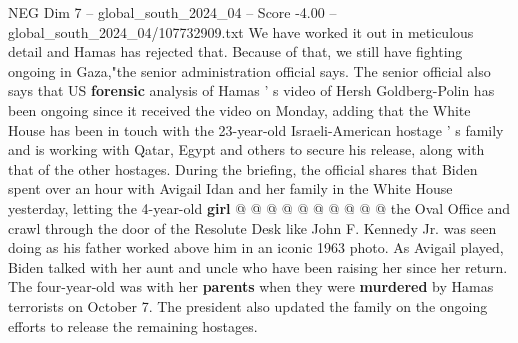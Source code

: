 \begin{textsample}{NEG Dim 7 – global\_south\_2024\_04 – Score -4.00 – global\_south\_2024\_04/107732909.txt}
We have worked it out in meticulous detail and Hamas has rejected that.
Because of that, we still have fighting ongoing in Gaza,"the senior administration official says.
The senior official also says that US \textbf{forensic} analysis of Hamas ' s video of Hersh Goldberg-Polin has been ongoing since it received the video on Monday, adding that the White House has been in touch with the 23-year-old Israeli-American hostage ' s family and is working with Qatar, Egypt and others to secure his release, along with that of the other hostages.
During the briefing, the official shares that Biden spent over an hour with Avigail Idan and her family in the White House yesterday, letting the 4-year-old \textbf{girl} @ @ @ @ @ @ @ @ @ @ the Oval Office and crawl through the door of the Resolute Desk like John F.
Kennedy Jr. was seen doing as his father worked above him in an iconic 1963 photo.
As Avigail played, Biden talked with her aunt and uncle who have been raising her since her return.
The four-year-old was with her \textbf{parents} when they were \textbf{murdered} by Hamas terrorists on October 7.
The president also updated the family on the ongoing efforts to release the remaining hostages.

\end{textsample}
